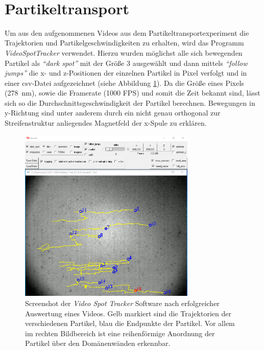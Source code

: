 \documentclass[page,pdftex,12pt,a4paper,twoside,openright]{scrbook}
\begin{document}
\newpage\\
\section{Partikeltransport \label{sec-partikelgeschwindigkeiten}}
\label{sec:org6e6d6a5}
Um aus den aufgenommenen Videos aus dem Partikeltransportexperiment die Trajektorien und Partikelgeschwindigkeiten zu erhalten, wird das Programm \emph{VideoSpotTracker} verwendet. Hierzu wurden möglichst alle sich bewegenden Partikel als \emph{"`dark spot"'} mit der Größe 3 ausgewählt und dann mittels \emph{"`follow jumps"'} die x- und z-Positionen der einzelnen Partikel in Pixel verfolgt und in einer csv-Datei aufgezeichnet (siehe Abbildung \ref{fig-videospottracker}). Da die Größe eines Pixels (\SI{278}{\nano\meter}), sowie die Framerate (1000 FPS) und somit die Zeit bekannt sind, lässt sich so die Durchschnittsgeschwindigkeit der Partikel berechnen. Bewegungen in y-Richtung sind unter anderem durch ein nicht genau orthogonal zur Streifenstruktur anliegendes Magnetfeld der x-Spule zu erklären.\\

\begin{figure}[h]
\centering
\includegraphics[width=0.75\textwidth]{./img/videospottracker.png}
\caption{\label{fig-videospottracker}
Screenshot der \emph{Video Spot Tracker} Software nach erfolgreicher Auswertung eines Videos. Gelb markiert sind die Trajektorien der verschiedenen Partikel, blau die Endpunkte der Partikel. Vor allem im rechten Bildbereich ist eine reihenförmige Anordnung der Partikel über den Domänenwänden erkennbar.}
\end{figure}
\end{document}
